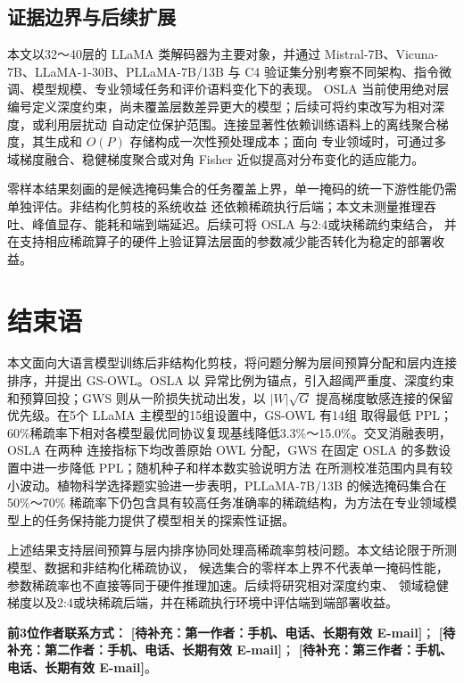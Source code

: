 \documentclass[UTF8,fontset=fandol]{ctexart}
\newcommand{\method}{GS-OWL}
\newcommand{\placeholder}[1]{\textbf{[待补充：#1]}}
\begin{document}
\subsection{证据边界与后续扩展}

本文以32～40层的 LLaMA 类解码器为主要对象，并通过 Mistral-7B、Vicuna-7B、LLaMA-1-30B、PLLaMA-7B/13B
与 C4 验证集分别考察不同架构、指令微调、模型规模、专业领域任务和评价语料变化下的表现。
OSLA 当前使用绝对层编号定义深度约束，尚未覆盖层数差异更大的模型；后续可将约束改写为相对深度，或利用层扰动
自动定位保护范围。连接显著性依赖训练语料上的离线聚合梯度，其生成和 $O(P)$ 存储构成一次性预处理成本；面向
专业领域时，可通过多域梯度融合、稳健梯度聚合或对角 Fisher 近似提高对分布变化的适应能力。

零样本结果刻画的是候选掩码集合的任务覆盖上界，单一掩码的统一下游性能仍需单独评估。非结构化剪枝的系统收益
还依赖稀疏执行后端；本文未测量推理吞吐、峰值显存、能耗和端到端延迟。后续可将 OSLA 与2:4或块稀疏约束结合，
并在支持相应稀疏算子的硬件上验证算法层面的参数减少能否转化为稳定的部署收益。

\section{结束语}

本文面向大语言模型训练后非结构化剪枝，将问题分解为层间预算分配和层内连接排序，并提出 \method。OSLA 以
异常比例为锚点，引入超阈严重度、深度约束和预算回投；GWS 则从一阶损失扰动出发，以
$\lvert W\rvert\sqrt{G}$ 提高梯度敏感连接的保留优先级。在5个 LLaMA 主模型的15组设置中，GS-OWL 有14组
取得最低 PPL；60\%稀疏率下相对各模型最优同协议复现基线降低3.3\%～15.0\%。交叉消融表明，OSLA 在两种
连接指标下均改善原始 OWL 分配，GWS 在固定 OSLA 的多数设置中进一步降低 PPL；随机种子和样本数实验说明方法
在所测校准范围内具有较小波动。植物科学选择题实验进一步表明，PLLaMA-7B/13B 的候选掩码集合在50\%～70\%
稀疏率下仍包含具有较高任务准确率的稀疏结构，为方法在专业领域模型上的任务保持能力提供了模型相关的探索性证据。

上述结果支持层间预算与层内排序协同处理高稀疏率剪枝问题。本文结论限于所测模型、数据和非结构化稀疏协议，
候选集合的零样本上界不代表单一掩码性能，参数稀疏率也不直接等同于硬件推理加速。后续将研究相对深度约束、
领域稳健梯度以及2:4或块稀疏后端，并在稀疏执行环境中评估端到端部署收益。

\FloatBarrier


\vspace{4pt}
\noindent\textbf{前3位作者联系方式：}
\placeholder{第一作者：手机、电话、长期有效 E-mail}；
\placeholder{第二作者：手机、电话、长期有效 E-mail}；
\placeholder{第三作者：手机、电话、长期有效 E-mail}。
\end{document}
